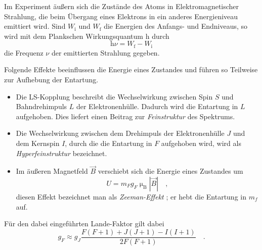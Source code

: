 	Im Experiment äußern sich die Zustände des Atoms in 
	Elektromagnetischer Strahlung, die beim Übergang eines Elektrons 
	in ein anderes Energieniveau emittiert wird. Sind $W_\text{i}$ und 
	$W_\text{f}$  die Energien des Anfangs- und Endniveaus, so wird 
	mit dem Plankschen Wirkungsquantum $\text{h}$ durch 
	\begin{equation}
		\text{h} \nu = W_\text{f}- W_\text{i} \label{eq:hnu}
	\end{equation}
	die Frequenz $\nu$ der emittierten Strahlung gegeben.
	
	Folgende Effekte beeinflussen die Energie eines Zustandes und 
	führen so Teilweise zur Aufhebung der Entartung.
	\begin{itemize}
		\item Die LS-Kopplung beschreibt die Wechselwirkung zwischen 
			Spin $S$ und Bahndrehimpuls $L$ der Elektronenhülle. Dadurch 
			wird 
			die Entartung in $L$ aufgehoben. Dies liefert einen 
			Beitrag zur \textit{Feinstruktur} des Spektrums.
		\item Die Wechselwirkung zwischen dem Drehimpuls der 
			Elektronenhülle $J$ und dem Kernspin $I$, durch die  
			die Entartung in $F$ aufgehoben wird, wird als 
			\textit{Hyperfeinstruktur} bezeichnet.
		\item Im äußeren Magnetfeld $\vec{B}$ verschiebt sich die 
			Energie eines Zustandes um 
			\begin{equation}
				U = m_F g_F \upmu_\text{B} |\vec{B}| \quad ,
			\end{equation}
			diesen Effekt bezeichnet man als \textit{Zeeman-Effekt}
			 \cite{Praktikum}; er hebt die Entartung in 
			$m_f$ auf.
	\end{itemize}
	Für den dabei eingeführten Lande-Faktor gilt dabei
	\begin{equation}
		g_F \approx g_J \frac{F(F+1)+J(J+1)-I(I+1)}{2F(F+1)} \quad .
		\label{eq:g_F}
	\end{equation}
	
